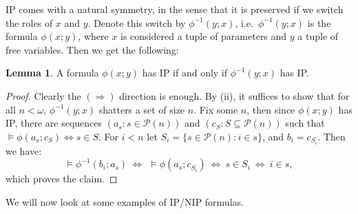 \documentclass[a4paper]{report}
\newcommand{\ind}{\hspace{15pt}}
\newcommand{\PS}{\mathcal{P}}
\renewcommand{\implies}{\Rightarrow}
\renewcommand{\iff}{\Leftrightarrow}
\theoremstyle{definition}
\newtheorem{lem}[thm]{Lemma}
\theoremstyle{remstyle}
\begin{document}
\ind IP comes with a natural symmetry, in the sense that it is preserved if we switch the roles of $x$ and $y$. Denote this switch by $\phi^{-1}(y;x)$, i.e.\ $\phi^{-1}(y;x)$ is the formula $\phi(x;y)$, where $x$ is considered a tuple of parameters and $y$ a tuple of free variables. Then we get the following:

\begin{lem}\label{swap}
	A formula $\phi(x;y)$ has IP if and only if $\phi^{-1}(y;x)$ has IP.
\end{lem}

\begin{proof}
	Clearly the $(\implies)$ direction is enough. By  (ii), it suffices to show that for all $n<\omega$, $\phi^{-1}(y;x)$ shatters a set of size $n$. Fix some $n$, then since $\phi(x;y)$ has IP, there are sequences $(a_s:s\in\PS(n))$ and $(c_S:S\subseteq\PS(n))$ such that $\models\phi(a_s;c_S) \iff s\in S$. For $i<n$ let $S_i=\{s\in\PS(n):i\in s\}$, and $b_i = c_{S_i}$. Then we have:
	\begin{equation*}
		\models\phi^{-1}(b_i;a_s) \: \iff \:\, \models\phi(a_s;c_{S_i}) \: \iff \: s \in S_i \: \iff\: i\in s,
	\end{equation*}
	which proves the claim.
\end{proof}

\ind We will now look at some examples of IP/NIP formulas.
\end{document}
